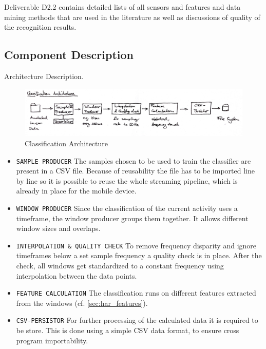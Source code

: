 Deliverable D2.2 contains detailed lists of all sensors and features
and data mining methods that are used in the literature as well as
discussions of quality of the recognition results.

\subsection{Component Description}\label{sec:har_component}

Architecture Description.

\begin{figure}[htbp]
\centering
\includegraphics[width=\textwidth]{img/har/classification_architecture.jpg}
\caption{Classification Architecture}\label{fig:classification_architecture}
\end{figure}

\begin{itemize}
  \item \texttt{SAMPLE PRODUCER} The samples chosen to be used to train the 
    classifier are present in a CSV file. Because of reusability the file has 
    to be imported line by line so it is possible to reuse the whole streaming
    pipeline, which is already in place for the mobile device.
  \item \texttt{WINDOW PRODUCER} Since the classification of the current 
    activity uses a timeframe, the window producer groups them together. It
    allows different window sizes and overlaps.
  \item \texttt{INTERPOLATION \& QUALITY CHECK} To remove frequency disparity 
    and ignore timeframes below a set sample frequency a quality check is in 
    place. After the check, all windows get standardized to a constant frequency
    using interpolation between the data points.
  \item \texttt{FEATURE CALCULATION} The classification runs on different 
    features extracted from the windows (cf. \ref{sec:har_features}).
  \item \texttt{CSV-PERSISTOR} For further processing of the calculated data
    it is required to be store. This is done using a simple CSV data format,
    to ensure cross program importability.
\end{itemize}

